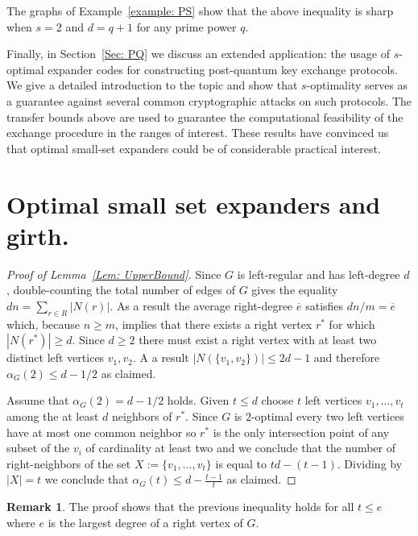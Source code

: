 \documentclass[12pt]{amsart}
\theoremstyle{definition}
\newtheorem{remark}[lemma]{Remark}
\renewcommand{\geq}{\geqslant}
\renewcommand{\leq}{\leqslant}
\newcommand{\1}{\ensuremath{\mathbb{1}}}
\begin{document}
The graphs of Example~\ref{example: PS} show that the above inequality is sharp when $s=2$ and $d=q+1$ for any prime power $q$.

Finally, in Section~\ref{Sec: PQ} we discuss an extended application: the usage of $s$-optimal expander codes for constructing post-quantum key exchange protocols. We give a detailed introduction to the topic and show that $s$-optimality serves as a guarantee against several common cryptographic attacks on such protocols. The transfer bounds above are used to guarantee the computational feasibility of the exchange procedure in the ranges of interest. These results have convinced us that optimal small-set expanders could be of considerable practical interest.


\section{Optimal small set expanders and girth.}

\begin{proof}[Proof of Lemma~\ref{Lem: UpperBound}] Since $G$ is left-regular and has left-degree $d$, double-counting the total number of edges of $G$ gives the equality $dn = \sum_{r\in R} |N(r)|$. As a result the average right-degree $\overline{e}$ satisfies $dn/m =\overline{e}$ which, because $n\geq m$, implies that there exists a right vertex $r^*$ for which $|N(r^*)|\geq d$. Since $d\geq 2$ there must exist a right vertex with at least two distinct left vertices $v_1,v_2$. A a result $|N(\{v_1,v_2\})|\leq 2d-1$ and therefore $\alpha_G(2)\leq d-1/2$ as claimed.

Assume that $\alpha_G(2) = d-1/2$ holds. Given $t\leq d$ choose $t$ left vertices $v_1,\dots, v_t$ among the at least $d$ neighbors of $r^*$. Since $G$ is $2$-optimal every two left vertices have at most one common neighbor so $r^*$ is the only intersection point of any subset of the $v_i$ of cardinality at least two and we conclude that the number of right-neighbors of the set $X:=\{v_1,\dots, v_t\}$ is equal to $td-(t-1)$. Dividing by $|X|=t$ we conclude that $\alpha_G(t)\leq d-\frac{t-1}{t}$ as claimed.\end{proof}
\begin{remark} The proof shows that the previous inequality holds for all $t\leq e$ where $e$ is the largest degree of a right vertex of $G$.
\end{remark}
\end{document}
